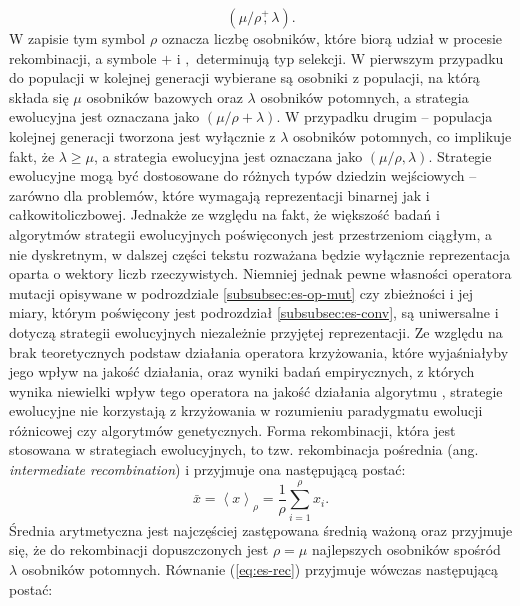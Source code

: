     \begin{equation}
     (\mu/\rho  \overset{+}{,} \lambda).
    \end{equation}
    W zapisie tym symbol $\rho$ oznacza liczbę osobników, które biorą udział w procesie rekombinacji, a symbole $+$ i $,$ determinują typ selekcji. W pierwszym przypadku do populacji w kolejnej generacji wybierane są osobniki z populacji, na którą składa się $\mu$ osobników bazowych oraz $\lambda$ osobników potomnych, a strategia ewolucyjna jest oznaczana jako $(\mu/\rho + \lambda)$. W przypadku drugim -- populacja kolejnej generacji tworzona jest wyłącznie z $\lambda$ osobników potomnych, co implikuje fakt, że $\lambda \geq \mu$, a strategia ewolucyjna jest oznaczana jako  $(\mu/\rho, \lambda)$.
    Strategie ewolucyjne mogą być dostosowane do różnych typów dziedzin wejściowych -- zarówno dla problemów, które wymagają reprezentacji binarnej jak i całkowitoliczbowej. Jednakże ze względu na fakt, że większość badań i algorytmów strategii ewolucyjnych poświęconych jest przestrzeniom ciągłym, a nie dyskretnym, w dalszej części tekstu rozważana będzie wyłącznie reprezentacja oparta o wektory liczb rzeczywistych. Niemniej jednak pewne własności operatora mutacji opisywane w podrozdziale \ref{subsubsec:es-op-mut} czy zbieżności i jej miary, którym poświęcony jest podrozdział \ref{subsubsec:es-conv}, są uniwersalne i dotyczą strategii ewolucyjnych niezależnie przyjętej reprezentacji. 
    Ze względu na brak teoretycznych podstaw działania operatora krzyżowania, które wyjaśniałyby jego wpływ na jakość działania, oraz wyniki badań empirycznych, z których wynika niewielki wpływ tego operatora na jakość działania algorytmu \source, strategie ewolucyjne nie korzystają z krzyżowania w rozumieniu paradygmatu ewolucji różnicowej czy algorytmów genetycznych. Forma rekombinacji, która jest stosowana w strategiach ewolucyjnych, to tzw. rekombinacja pośrednia (ang. \textit{intermediate recombination}) i przyjmuje ona następującą postać:
    \begin{equation}
        \label{eq:es-rec}
        \bar{x} = \left<x\right>_{\rho} = \frac{1}{\rho}\sum^{\rho}_{i = 1} x_{i}.
    \end{equation}
    Średnia arytmetyczna jest najczęściej zastępowana średnią ważoną oraz przyjmuje się, że do rekombinacji dopuszczonych jest $\rho = \mu$ najlepszych osobników spośród $\lambda$ osobników potomnych. Równanie (\ref{eq:es-rec}) przyjmuje wówczas następującą postać:
    
